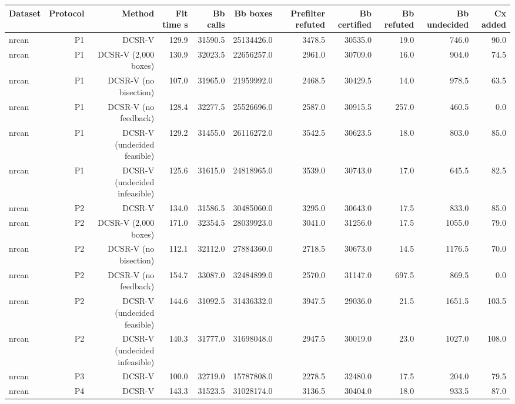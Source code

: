 \begin{tabular}{lrrrrrrrrrr}
\toprule
Dataset & Protocol & Method & Fit time s & Bb calls & Bb boxes & Prefilter refuted & Bb certified & Bb refuted & Bb undecided & Cx added \\
\midrule
nrcan & P1 & DCSR-V & 129.9 & 31590.5 & 25134426.0 & 3478.5 & 30535.0 & 19.0 & 746.0 & 90.0 \\
nrcan & P1 & DCSR-V (2,000 boxes) & 130.9 & 32023.5 & 22656257.0 & 2961.0 & 30709.0 & 16.0 & 904.0 & 74.5 \\
nrcan & P1 & DCSR-V (no bisection) & 107.0 & 31965.0 & 21959992.0 & 2468.5 & 30429.5 & 14.0 & 978.5 & 63.5 \\
nrcan & P1 & DCSR-V (no feedback) & 128.4 & 32277.5 & 25526696.0 & 2587.0 & 30915.5 & 257.0 & 460.5 & 0.0 \\
nrcan & P1 & DCSR-V (undecided feasible) & 129.2 & 31455.0 & 26116272.0 & 3542.5 & 30623.5 & 18.0 & 803.0 & 85.0 \\
nrcan & P1 & DCSR-V (undecided infeasible) & 125.6 & 31615.0 & 24818965.0 & 3539.0 & 30743.0 & 17.0 & 645.5 & 82.5 \\
nrcan & P2 & DCSR-V & 134.0 & 31586.5 & 30485060.0 & 3295.0 & 30643.0 & 17.5 & 833.0 & 85.0 \\
nrcan & P2 & DCSR-V (2,000 boxes) & 171.0 & 32354.5 & 28039923.0 & 3041.0 & 31256.0 & 17.5 & 1055.0 & 79.0 \\
nrcan & P2 & DCSR-V (no bisection) & 112.1 & 32112.0 & 27884360.0 & 2718.5 & 30673.0 & 14.5 & 1176.5 & 70.0 \\
nrcan & P2 & DCSR-V (no feedback) & 154.7 & 33087.0 & 32484899.0 & 2570.0 & 31147.0 & 697.5 & 869.5 & 0.0 \\
nrcan & P2 & DCSR-V (undecided feasible) & 144.6 & 31092.5 & 31436332.0 & 3947.5 & 29036.0 & 21.5 & 1651.5 & 103.5 \\
nrcan & P2 & DCSR-V (undecided infeasible) & 140.3 & 31777.0 & 31698048.0 & 2947.5 & 30019.0 & 23.0 & 1027.0 & 108.0 \\
nrcan & P3 & DCSR-V & 100.0 & 32719.0 & 15787808.0 & 2278.5 & 32480.0 & 17.5 & 204.0 & 79.5 \\
nrcan & P4 & DCSR-V & 143.3 & 31523.5 & 31028174.0 & 3136.5 & 30404.0 & 18.0 & 933.5 & 87.0 \\
\bottomrule
\end{tabular}
